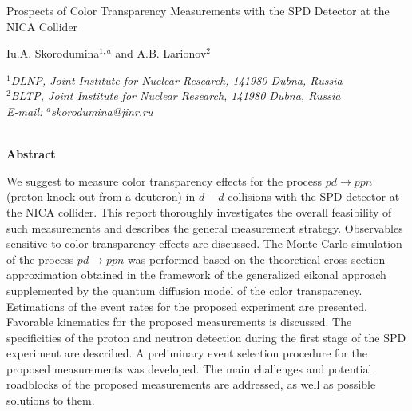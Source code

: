 \noindent\begin{minipage}{\textwidth}
\begin{center}
\thispagestyle{empty}
\vspace{0.5cm}
{ \Large{Prospects of Color Transparency Measurements with the
SPD Detector at the NICA Collider}}\\
\vspace{1cm}

{\large Iu.A. Skorodumina$^{1, a}$ and A.B. Larionov$^{2}$} \\[16pt]

\parbox{.86\textwidth}{\centering\footnotesize\it
$^1$DLNP, Joint Institute for Nuclear Research, 141980 Dubna, Russia\\[3pt]
$^2$BLTP, Joint Institute for Nuclear Research, 141980 Dubna, Russia\\[18pt]

E-mail: $^a$skorodumina@jinr.ru}\\


\vspace{2cm}
{\bf Abstract}\\[9pt]

\end{center}
{\small We suggest to measure color transparency effects for the process $pd\rightarrow ppn$ (proton knock-out from a deuteron) in $d-d$ collisions with the SPD detector at the NICA collider. This report thoroughly investigates the overall feasibility of such measurements and describes the general measurement strategy. Observables sensitive to color transparency effects are discussed. The Monte Carlo simulation of the process $pd\rightarrow ppn$ was performed based on the theoretical cross section approximation obtained in the framework of the generalized eikonal approach supplemented by the quantum diffusion model of the color transparency. Estimations of the event rates for the proposed experiment are presented. Favorable kinematics for the proposed measurements is discussed. The specificities of the proton and neutron detection during the first stage of the SPD experiment are described. A preliminary event selection procedure for the proposed measurements was developed. The main challenges and potential roadblocks of the proposed measurements are addressed, as well as possible solutions to them.}


\end{minipage}

